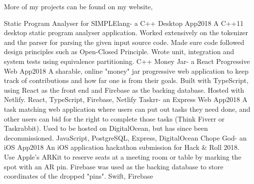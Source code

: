 %
%
%

\begin{center}
	More of my projects can be found on my website, 
\end{center}

\begin{projects}
	\project
	{Static Program Analyser for SIMPLElang}{- a C++ Desktop App}{2018}
	{}
	{A C++11 desktop static program analyser application. Worked extensively on the tokenizer and the parser for parsing the given input source code. Made sure code followed design principles such as Open-Closed Principle. Wrote unit, integration and system tests using equivalence partitioning.}
	{C++}
	\project
	{Money Jar}{- a React Progressive Web App}{2018}
	{  }
	{A sharable, online "money" jar progressive web application to keep track of contributions and how far one is from their goals. Built with TypeScript, using React as the front end and Firebase as the backing database. Hosted with Netlify.}
	{React, TypeScript, Firebase, Netlify}
	\project
	{Taskrr}{- an Express Web App}{2018}
	{}
	{A task matching web application where users can put out tasks they need done, and other users can bid for the right to complete those tasks (Think Fiverr or Taskrabbit). Used to be hosted on DigitalOcean, but has since been decommissioned.}
	{JavaScript, PostgreSQL, Express, DigitalOcean}
	\project
	{Chope God}{- an iOS App}{2018}
	{}
	{An iOS application hackathon submission for Hack \& Roll 2018. Use Apple’s ARKit to reserve seats at a meeting room or table by marking the spot with an AR pin.  Firebase was used as the backing database to store coordinates of the dropped "pins".}
	{Swift, Firebase}
\end{projects}
